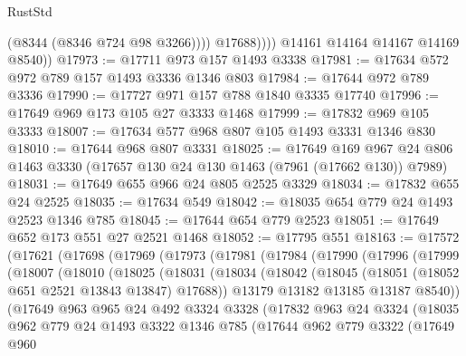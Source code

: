 \begin{lexlean}{RustStd}
\begin{coremodule}
                    (@8344 (@8346 @724 @98 @3266))))
                @17688))))
        @14161
        @14164
        @14167
        @14169
        @8540))
@17973 := @17711 @973 @157 @1493 @3338
@17981 := @17634 @572 @972 @789 @157 @1493 @3336 @1346 @803
@17984 := @17644 @972 @789 @3336
@17990 := @17727 @971 @157 @788 @1840 @3335 @17740
@17996 := @17649 @969 @173 @105 @27 @3333 @1468
@17999 := @17832 @969 @105 @3333
@18007 := @17634 @577 @968 @807 @105 @1493 @3331 @1346 @830
@18010 := @17644 @968 @807 @3331
@18025 := @17649
    @169
    @967
    @24
    @806
    @1463
    @3330
    (@17657 @130 @24 @130 @1463 (@7961 (@17662 @130)) @7989)
@18031 := @17649 @655 @966 @24 @805 @2525 @3329
@18034 := @17832 @655 @24 @2525
@18035 := @17634 @549
@18042 := @18035 @654 @779 @24 @1493 @2523 @1346 @785
@18045 := @17644 @654 @779 @2523
@18051 := @17649 @652 @173 @551 @27 @2521 @1468
@18052 := @17795 @551
@18163 := @17572
    (@17621
      (@17698
        (@17969
          (@17973
            (@17981
              (@17984
                (@17990
                  (@17996
                    (@17999
                      (@18007
                        (@18010
                          (@18025
                            (@18031
                              (@18034
                                (@18042
                                  (@18045 (@18051 (@18052 @651 @2521 @13843 @13847) @17688))
                                  @13179
                                  @13182
                                  @13185
                                  @13187
                                  @8540))
                              (@17649
                                @963
                                @965
                                @24
                                @492
                                @3324
                                @3328
                                (@17832
                                  @963
                                  @24
                                  @3324
                                  (@18035
                                    @962
                                    @779
                                    @24
                                    @1493
                                    @3322
                                    @1346
                                    @785
                                    (@17644
                                      @962
                                      @779
                                      @3322
                                      (@17649
                                        @960

\end{coremodule}
\end{lexlean}

